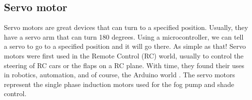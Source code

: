 \documentclass[conference]{IEEEtran}
\begin{document}
\subsection{Servo motor}
Servo motors are great devices that can turn to a specified position. Usually, they have a servo
arm that can turn 180 degrees. Using a microcontroller, we can tell a servo to go to a specified
position and it will go there. As simple as that! Servo motors were first used in the Remote
Control (RC) world, usually to control the steering of RC cars or the flaps on a RC plane. With
time, they found their uses in robotics, automation, and of course, the Arduino world \cite{b8}. The
servo motors represent the single phase induction motors used for the fog pump and shade control.




\end{document}
